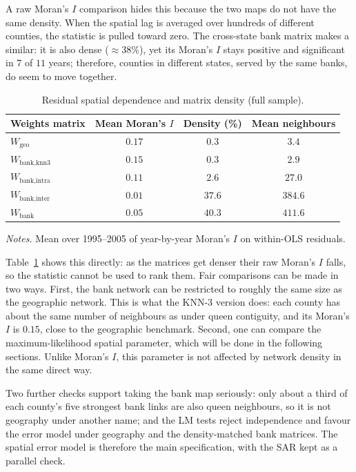 A raw Moran's $I$ comparison hides this because the two maps do not have the same density. When the spatial lag is averaged over hundreds of different counties, the
statistic is pulled toward zero. The cross-state bank matrix makes a similar: it is
also dense ($\approx 38\%$), yet its Moran's $I$ stays positive and significant in
$7$ of $11$ years; therefore, counties in different states, served by the same banks, do seem to
move together.

\begin{table}[htbp]
  \centering
  \caption{Residual spatial dependence and matrix density (full sample).}
  \label{tab:moran-summary}
  \small
  \begin{tabular}{lccc}
    \toprule
    Weights matrix & Mean Moran's $I$ & Density (\%) & Mean neighbours \\
    \midrule
    $W_{\text{geo}}$ & $0.17$ & $0.3$ & $3.4$ \\
    $W_{\text{bank,knn3}}$ & $0.15$ & $0.3$ & $2.9$ \\
    $W_{\text{bank,intra}}$ & $0.11$ & $2.6$ & $27.0$ \\
    $W_{\text{bank,inter}}$ & $0.01$ & $37.6$ & $384.6$ \\
    $W_{\text{bank}}$ & $0.05$ & $40.3$ & $411.6$ \\
    \bottomrule
  \end{tabular}
  \begin{tablenotes}\footnotesize
  \item \emph{Notes.} Mean over 1995--2005 of year-by-year Moran's $I$ on within-OLS residuals.
  \end{tablenotes}
\end{table}

Table~\ref{tab:moran-summary} shows this directly: as the matrices get denser their
raw Moran's $I$ falls, so the statistic cannot be used to rank them. Fair comparisons can be made in two ways. First, the bank network can be restricted to roughly the same size as the geographic network. This is what the KNN-3 version does: each county has about the same number of neighbours as under queen contiguity, and its Moran’s $I$ is $0.15$, close to the geographic benchmark. Second, one can compare the maximum-likelihood spatial parameter, which will be done in the following sections. Unlike Moran’s $I$, this parameter is not affected by network density in the same direct way. 

Two further checks support taking the bank map seriously: only about a
third of each county's five strongest bank links are also queen neighbours, so it is not
geography under another name; and the LM tests reject independence and favour the
error model under geography and the density-matched bank matrices. The spatial error model is therefore the main specification, with the SAR kept as a parallel
check.

